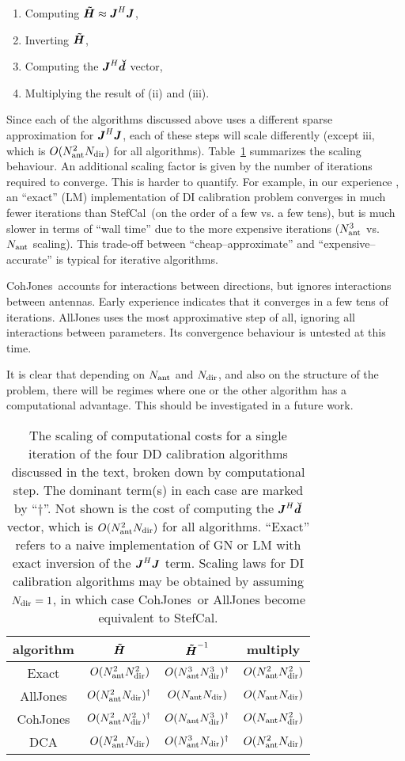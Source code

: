 \documentclass[useAMS,usenatbib]{mn2e}
\newcommand{\mat}[1]{{\bmath{#1}}}
\newcommand{\JJ}{\mat{J}} %
\newcommand{\HHa}{\mat{\tilde{H}}} %
\newcommand{\JHJ}{\JJ^H\JJ} %
\newcommand{\AUG}[1]{\bmath{\breve{#1}}}
\newcommand{\Dd}{\AUG{d}}
\newcommand{\COH}{{\sc CohJones}}
\newcommand{\StefCal}{{\sc StefCal}}
\numberwithin{equation}{section}
\begin{document}
\begin{enumerate}
\item Computing $\HHa \approx \JHJ$,
\item Inverting $\HHa$,
\item Computing the $\JJ^H\Dd$ vector,
\item Multiplying the result of (ii) and (iii). 
\end{enumerate}

Since each of the algorithms discussed above uses a different sparse approximation for $\JHJ$, each of these 
steps will scale differently (except iii, which is $O(N_\mathrm{ant}^2N_\mathrm{dir})$ for all algorithms). Table~\ref{tab:costs} 
summarizes the scaling behaviour. 
An additional scaling factor is given by the number of iterations required to converge. This is harder
to quantify. For example, in our experience \citep{OMS-Stefcal}, an ``exact'' (LM) implementation of
DI calibration problem converges in much fewer iterations than \StefCal\ (on the order of a few vs. a few tens), but is much 
slower in terms of ``wall time'' due to the more expensive iterations ($N_\mathrm{ant}^3$ vs. $N_\mathrm{ant}$ scaling). This trade-off  
between ``cheap--approximate'' and ``expensive--accurate'' is typical for iterative algorithms. 

\COH\ accounts for interactions between directions, but ignores interactions between antennas. Early experience 
indicates that it converges in a few tens of iterations. {\sc AllJones} uses the most approximative step of all,
ignoring all interactions between parameters. Its convergence behaviour is untested at this time.

It is clear that depending on $N_\mathrm{ant}$ and $N_\mathrm{dir}$, and also on the structure of the problem, there will be 
regimes where one or the other algorithm has a computational advantage. This should be investigated in a future work.


\begin{table}
\caption{\label{tab:costs}The scaling of computational costs for a single iteration of the 
four DD calibration algorithms discussed in the text, broken down by computational step. 
The dominant term(s) in each case are marked by ``$\dagger$''. Not shown is the cost of computing the $\JJ^H\Dd$ 
vector, which is $O(N_\mathrm{ant}^2N_\mathrm{dir})$ for all algorithms. ``Exact'' refers to a naive implementation of GN or LM with exact 
inversion of the $\JHJ$ term. Scaling laws for DI calibration algorithms may be obtained by assuming $N_\mathrm{dir}=1$, in which
case \COH\ or {\sc AllJones} become equivalent to \StefCal. 
}
\begin{tabular}{c|ccc}
\hline
algorithm & $\HHa$ & $\HHa^{-1}$ & multiply \\
\hline
Exact          & $O(N_\mathrm{ant}^2N_\mathrm{dir}^2)$ & $O(N_\mathrm{ant}^3N_\mathrm{dir}^3)^\dagger$ &  $O(N_\mathrm{ant}^2N_\mathrm{dir}^2)$ \\ 
{\sc AllJones} & $O(N_\mathrm{ant}^2N_\mathrm{dir})^\dagger$   & $O(N_\mathrm{ant}N_\mathrm{dir})$     &  $O(N_\mathrm{ant}N_\mathrm{dir})$ \\
\COH           & $O(N_\mathrm{ant}^2N_\mathrm{dir}^2)^\dagger$ & $O(N_\mathrm{ant}N_\mathrm{dir}^3)^\dagger$   &  $O(N_\mathrm{ant}N_\mathrm{dir}^2)$ \\
DCA            & $O(N_\mathrm{ant}^2N_\mathrm{dir})$   & $O(N_\mathrm{ant}^3N_\mathrm{dir})^\dagger$   &  $O(N_\mathrm{ant}^2N_\mathrm{dir})$ \\
\hline
\end{tabular}
\end{table}
\end{document}

